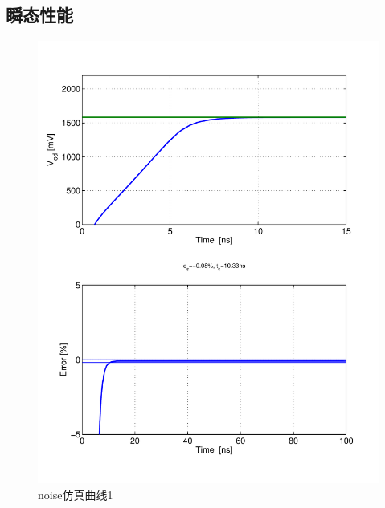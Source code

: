 \documentclass[a4paper]{article}
\begin{document}
\subsection{瞬态性能}
\begin{figure}[htb]
    \begin{center}
        \includegraphics[width=\textwidth]{common/tran1.pdf}
    \end{center}
    \caption{noise仿真曲线1}
    \label{commontran1}
\end{figure}
\end{document}
